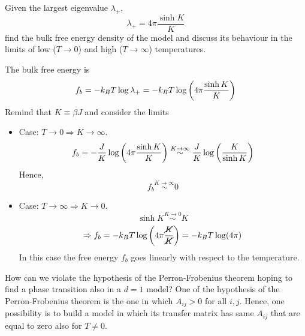 \documentclass[../../Main/Main.tex]{subfiles}
\begin{document}
\begin{exercise}{}{}
Given the largest eigenvalue \( \lambda _+ \),
\begin{equation*}
  \lambda _+ = 4 \pi \frac{\sinh K }{K}
\end{equation*}
find the bulk free energy density of the model and discuss its behaviour in the limits of low (\( T \rightarrow 0 \)) and high (\( T \rightarrow \infty  \)) temperatures.
\begin{solution}
The bulk free energy is 
\begin{equation*}
    f_b = -k_B T \log \lambda_+ = -k_B T \log \qty(  4 \pi \frac{\sinh K }{K} )
\end{equation*}
Remind that \( K \equiv \beta J \) and consider the limits
\begin{itemize}
    \item Case: \( T \rightarrow 0 \Rightarrow K \rightarrow \infty \).
    \begin{equation*}
       f_b = - \frac{J}{K} \log \qty(  4 \pi \frac{\sinh K }{K} )
        \overset{K \rightarrow \infty}{\sim}
        \frac{J}{K}   \log \qty(  \frac{K}{\sinh K} )
    \end{equation*}    
    Hence,
    \begin{equation*}
       f_b \overset{K \rightarrow \infty}{\sim} 0
    \end{equation*}      
    \item Case: \( T \rightarrow \infty \Rightarrow K \rightarrow 0 \).
    \begin{equation*}
        \sinh K \overset{K \rightarrow 0}{\sim} K
    \end{equation*}
    \begin{equation*}
        \Rightarrow f_b = - k_B T \log \qty(  4 \pi \frac{ \cancel{K} }{\cancel{K}} ) = - k_B T \log (4 \pi)
    \end{equation*}
    In this case the free energy \(f_b\) goes linearly with respect to the temperature.
\end{itemize}

\end{solution}
\end{exercise}


How can we violate the hypothesis of the Perron-Frobenius theorem hoping to find a phase transition also in a \( d=1 \) model?
 One of the hypothesis of the Perron-Frobenius theorem is the one in which \( A_{ij}>0  \) for all \(i,j \). Hence, one possibility is to build a model in which its transfer matrix has same \( A_{ij} \) that are equal to zero also for \( T \neq 0 \).
\end{document}
